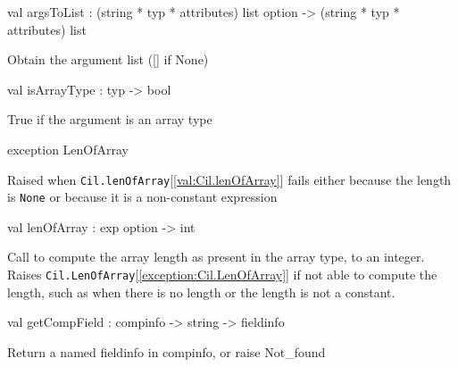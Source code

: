 \documentclass[11pt]{article}
\begin{document}
\label{val:Cil.argsToList}\begin{ocamldoccode}
val argsToList :
  (string * typ * attributes) list option ->
  (string * typ * attributes) list
\end{ocamldoccode}
\begin{ocamldocdescription}
Obtain the argument list ([] if None)


\end{ocamldocdescription}




\label{val:Cil.isArrayType}\begin{ocamldoccode}
val isArrayType : typ -> bool
\end{ocamldoccode}
\begin{ocamldocdescription}
True if the argument is an array type


\end{ocamldocdescription}




\label{exception:Cil.LenOfArray}\begin{ocamldoccode}
exception LenOfArray
\end{ocamldoccode}
\begin{ocamldocdescription}
Raised when {\tt{Cil.lenOfArray}}[\ref{val:Cil.lenOfArray}] fails either because the length is {\tt{None}} 
 or because it is a non-constant expression


\end{ocamldocdescription}




\label{val:Cil.lenOfArray}\begin{ocamldoccode}
val lenOfArray : exp option -> int
\end{ocamldoccode}
\begin{ocamldocdescription}
Call to compute the array length as present in the array type, to an 
 integer. Raises {\tt{Cil.LenOfArray}}[\ref{exception:Cil.LenOfArray}] if not able to compute the length, such 
 as when there is no length or the length is not a constant.


\end{ocamldocdescription}




\label{val:Cil.getCompField}\begin{ocamldoccode}
val getCompField : compinfo -> string -> fieldinfo
\end{ocamldoccode}
\begin{ocamldocdescription}
Return a named fieldinfo in compinfo, or raise Not\_found


\end{ocamldocdescription}
\end{document}
